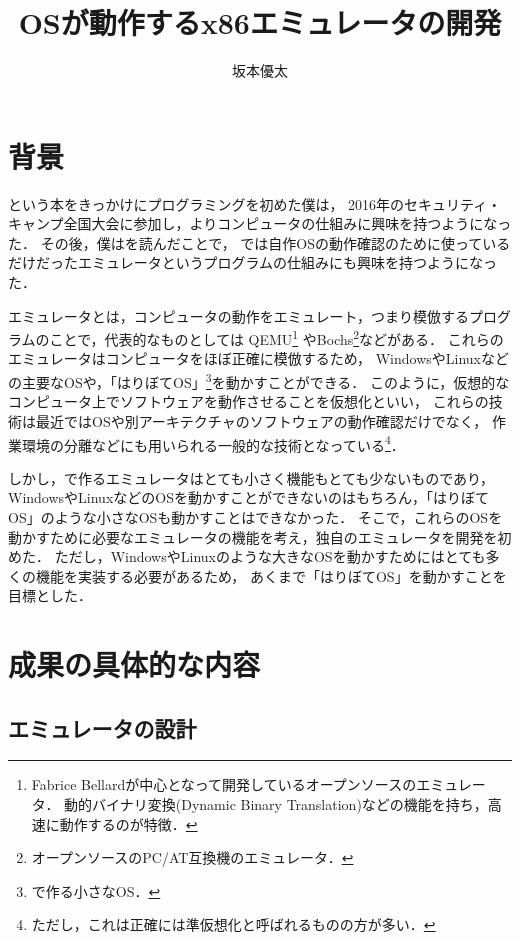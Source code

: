 \documentclass[10pt,a4j]{jsarticle}
\title{\vspace{-1.0cm}OSが動作するx86エミュレータの開発}
\author{坂本優太}
\date{}
\begin{document}
\maketitle
\vspace{-1.0cm}

\section{背景}
\cite[30日でできる！ OS自作入門]{30days-osdev}という本をきっかけにプログラミングを初めた僕は，
2016年のセキュリティ・キャンプ全国大会に参加し，よりコンピュータの仕組みに興味を持つようになった．
その後，僕は\cite[自作エミュレータで学ぶx86アーキテクチャ]{learn-x86-by-emu}を読んだことで，
\cite{30days-osdev}では自作OSの動作確認のために使っているだけだったエミュレータというプログラムの仕組みにも興味を持つようになった．

エミュレータとは，コンピュータの動作をエミュレート，つまり模倣するプログラムのことで，代表的なものとしては
QEMU\footnote{Fabrice Bellardが中心となって開発しているオープンソースのエミュレータ．
動的バイナリ変換(Dynamic Binary Translation)などの機能を持ち，高速に動作するのが特徴．}
やBochs\footnote{オープンソースのPC/AT互換機のエミュレータ．}などがある．
これらのエミュレータはコンピュータをほぼ正確に模倣するため，
WindowsやLinuxなどの主要なOSや，「はりぼてOS」\footnote{\cite{30days-osdev}で作る小さなOS．}を動かすことができる．
このように，仮想的なコンピュータ上でソフトウェアを動作させることを仮想化といい，
これらの技術は最近ではOSや別アーキテクチャのソフトウェアの動作確認だけでなく，
作業環境の分離などにも用いられる一般的な技術となっている\footnote{ただし，これは正確には準仮想化と呼ばれるものの方が多い．}．

しかし，\cite{learn-x86-by-emu}で作るエミュレータはとても小さく機能もとても少ないものであり，
WindowsやLinuxなどのOSを動かすことができないのはもちろん，「はりぼてOS」のような小さなOSも動かすことはできなかった．
そこで，これらのOSを動かすために必要なエミュレータの機能を考え，独自のエミュレータを開発を初めた．
ただし，WindowsやLinuxのような大きなOSを動かすためにはとても多くの機能を実装する必要があるため，
あくまで「はりぼてOS」を動かすことを目標とした．

\section{成果の具体的な内容}

\subsection{エミュレータの設計}
\end{document}

